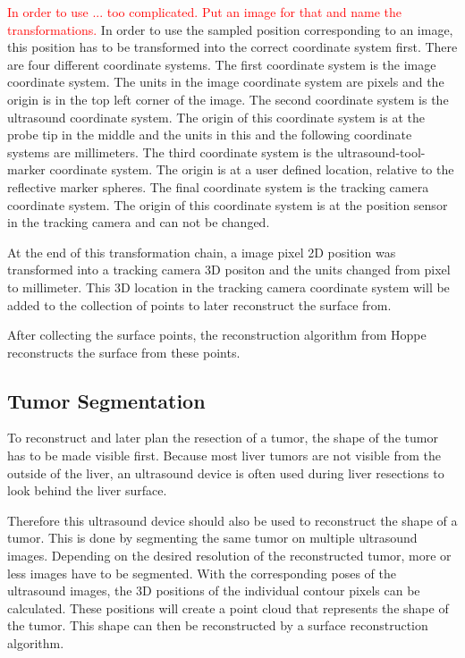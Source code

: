 \textcolor{red}{In order to use ... too complicated. Put an image for that and name the transformations.}
In order to use the sampled position corresponding to an image, this
position has to be transformed into the correct coordinate system first. There
are four different coordinate systems. The first coordinate system is the image
coordinate system. The units in the image coordinate system are pixels and the
origin is in the top left corner of the image. The
second coordinate system is the ultrasound coordinate system. The origin of this
coordinate system is at the probe tip in the middle and the units in this and
the following coordinate systems are millimeters. The third coordinate system is the
ultrasound-tool-marker coordinate system. The origin is at a user defined
location, relative to the reflective marker spheres. The final
coordinate system is the tracking camera coordinate system. The origin of this
coordinate system is at the position sensor in the tracking camera and can not
be changed.

At the end of this transformation chain, a image pixel 2D position was
transformed into a tracking camera 3D positon and the units changed
from pixel to millimeter. This 3D location in the tracking camera coordinate system
will be added to the collection of points to later reconstruct the surface from.

After collecting the surface points, the reconstruction algorithm from Hoppe
\cite{hoppe1992surface} reconstructs the surface from these points.
\subsection{Tumor Segmentation}
To reconstruct and later plan the resection of a tumor, the shape
of the tumor has to be made visible first. Because most liver tumors are not visible from the outside of the liver, an
ultrasound device is often used during liver resections to look behind the
liver surface.

Therefore this ultrasound device should also be used to
reconstruct the shape of a tumor. This is done by segmenting the same tumor on
multiple ultrasound images. Depending on the desired resolution of the
reconstructed tumor, more or less images have to be segmented. With the corresponding
poses of the ultrasound images, the 3D positions of the individual contour
pixels can be calculated. These positions will create a point cloud that
represents the shape of the tumor. This shape can then be reconstructed by a
surface reconstruction algorithm.
